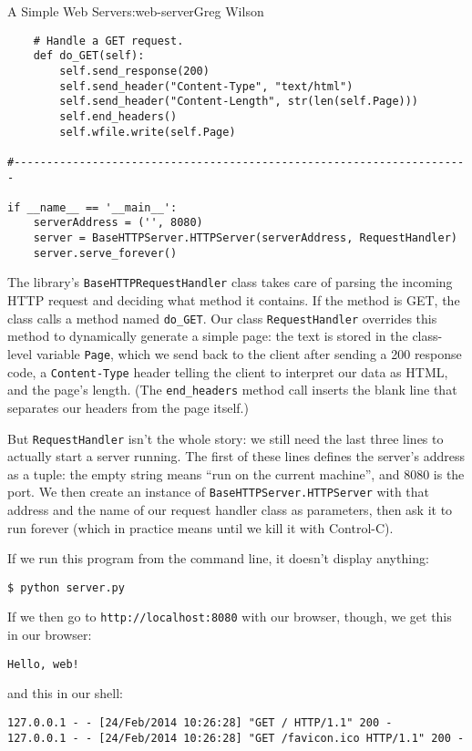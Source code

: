 \begin{aosachapter}{A Simple Web Server}{s:web-server}{Greg Wilson}
\begin{verbatim}
    # Handle a GET request.
    def do_GET(self):
        self.send_response(200)
        self.send_header("Content-Type", "text/html")
        self.send_header("Content-Length", str(len(self.Page)))
        self.end_headers()
        self.wfile.write(self.Page)

#----------------------------------------------------------------------

if __name__ == '__main__':
    serverAddress = ('', 8080)
    server = BaseHTTPServer.HTTPServer(serverAddress, RequestHandler)
    server.serve_forever()
\end{verbatim}

The library's \texttt{BaseHTTPRequestHandler} class takes care of
parsing the incoming HTTP request and deciding what method it contains.
If the method is GET, the class calls a method named \texttt{do\_GET}.
Our class \texttt{RequestHandler} overrides this method to dynamically
generate a simple page: the text is stored in the class-level variable
\texttt{Page}, which we send back to the client after sending a 200
response code, a \texttt{Content-Type} header telling the client to
interpret our data as HTML, and the page's length. (The
\texttt{end\_headers} method call inserts the blank line that separates
our headers from the page itself.)

But \texttt{RequestHandler} isn't the whole story: we still need the
last three lines to actually start a server running. The first of these
lines defines the server's address as a tuple: the empty string means
``run on the current machine'', and 8080 is the port. We then create an
instance of \texttt{BaseHTTPServer.HTTPServer} with that address and the
name of our request handler class as parameters, then ask it to run
forever (which in practice means until we kill it with Control-C).

If we run this program from the command line, it doesn't display
anything:

\begin{verbatim}
$ python server.py
\end{verbatim}

If we then go to \texttt{http://localhost:8080} with our browser,
though, we get this in our browser:

\begin{verbatim}
Hello, web!
\end{verbatim}

and this in our shell:

\begin{verbatim}
127.0.0.1 - - [24/Feb/2014 10:26:28] "GET / HTTP/1.1" 200 -
127.0.0.1 - - [24/Feb/2014 10:26:28] "GET /favicon.ico HTTP/1.1" 200 -
\end{verbatim}


\end{aosachapter}
